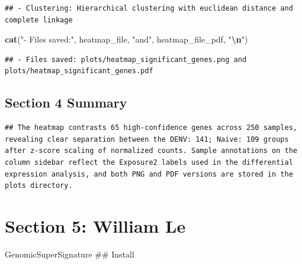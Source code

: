 \documentclass[
]{article}
\newenvironment{Shaded}{\begin{snugshade}}{\end{snugshade}}
\newcommand{\FunctionTok}[1]{\textcolor[rgb]{0.13,0.29,0.53}{\textbf{#1}}}
\newcommand{\NormalTok}[1]{#1}
\newcommand{\SpecialCharTok}[1]{\textcolor[rgb]{0.81,0.36,0.00}{\textbf{#1}}}
\newcommand{\StringTok}[1]{\textcolor[rgb]{0.31,0.60,0.02}{#1}}
\begin{document}
\begin{verbatim}
## - Clustering: Hierarchical clustering with euclidean distance and complete linkage
\end{verbatim}

\begin{Shaded}
\begin{Highlighting}[]
\FunctionTok{cat}\NormalTok{(}\StringTok{"{-} Files saved:"}\NormalTok{, heatmap\_file, }\StringTok{"and"}\NormalTok{, heatmap\_file\_pdf, }\StringTok{"}\SpecialCharTok{\textbackslash{}n}\StringTok{"}\NormalTok{)}
\end{Highlighting}
\end{Shaded}

\begin{verbatim}
## - Files saved: plots/heatmap_significant_genes.png and plots/heatmap_significant_genes.pdf
\end{verbatim}

\subsection{Section 4 Summary}\label{section-4-summary}

\begin{verbatim}
## The heatmap contrasts 65 high-confidence genes across 250 samples, revealing clear separation between the DENV: 141; Naive: 109 groups after z-score scaling of normalized counts. Sample annotations on the column sidebar reflect the Exposure2 labels used in the differential expression analysis, and both PNG and PDF versions are stored in the plots directory.
\end{verbatim}

\section{Section 5: William Le}\label{section-5-william-le}

GenomicSuperSignature \#\# Install
\end{document}
